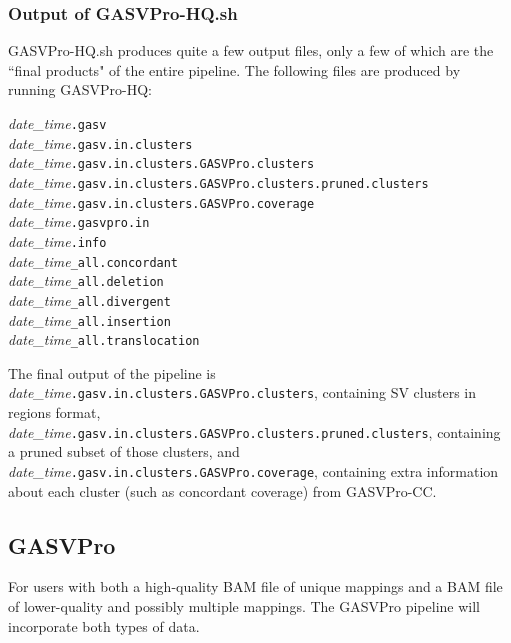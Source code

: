 \documentclass[11pt]{article}
\begin{document}
\subsubsection{Output of GASVPro-HQ.sh}
GASVPro-HQ.sh produces quite a few output files, only a few of which are the ``final products" of the entire pipeline. The following files are produced by running GASVPro-HQ:
\begin{framed}
\noindent \textit {date\_time}\verb+.gasv+\\				
\textit{date\_time}\verb+.gasv.in.clusters+\\
\textit {date\_time}\verb+.gasv.in.clusters.GASVPro.clusters+\\				
\textit {date\_time}\verb+.gasv.in.clusters.GASVPro.clusters.pruned.clusters+\\
\textit {date\_time}\verb+.gasv.in.clusters.GASVPro.coverage+\\
\textit {date\_time}\verb+.gasvpro.in+\\
\textit {date\_time}\verb+.info+\\
\textit {date\_time}\verb+_all.concordant+\\
\textit {date\_time}\verb+_all.deletion+\\
\textit {date\_time}\verb+_all.divergent+\\
\textit {date\_time}\verb+_all.insertion+\\
\textit {date\_time}\verb+_all.translocation+
\end{framed}
\noindent The final output of the pipeline is \textit {date\_time}\verb+.gasv.in.clusters.GASVPro.clusters+, containing SV clusters in regions format,			
\textit {date\_time}\verb+.gasv.in.clusters.GASVPro.clusters.pruned.clusters+, containing a pruned subset of those clusters, and 
\textit {date\_time}\verb+.gasv.in.clusters.GASVPro.coverage+, containing extra information about each cluster (such as concordant coverage) from GASVPro-CC. 

\subsection{GASVPro}
For users with both a high-quality BAM file of unique mappings and a BAM file of lower-quality and possibly multiple mappings. The GASVPro pipeline will incorporate both types of data. 
  
\end{document}
